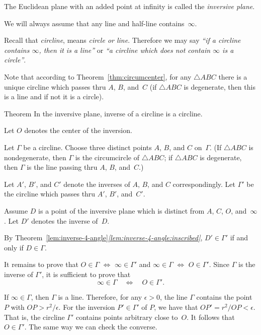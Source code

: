 The Euclidean plane with an added point at infinity is called the \emph{inversive plane}.

We will always assume that any line and half-line contains~$\infty$. 

Recall that
\emph{circline},
means {}\emph{circle or line}.
Therefore we may say 
{}\emph{``if a circline contains $\infty$, then it is a line''} or {}\emph{``a circline which does not contain $\infty$  is a circle''}.

Note that according to Theorem~\ref{thm:circumcenter}, 
for any $\triangle ABC$ there is a unique circline which passes thru $A$, $B$, and~$C$
(if $\triangle ABC$ is degenerate, then this is a line and if not it is a circle).

\begin{thm}{Theorem}\label{thm:inverse-cline}
In the inversive plane, inverse of a circline is a circline.
\end{thm}

Let $O$ denotes the center of the inversion.

Let $\Gamma$ be a circline.
Choose three distinct points $A$, $B$, and $C$ on~$\Gamma$.
(If $\triangle ABC$ is nondegenerate, 
then $\Gamma$ is the circumcircle of $\triangle ABC$;
if $\triangle ABC$ is degenerate, 
then $\Gamma$ is the line passing thru $A$, $B$, and~$C$.)

Let $A'$, $B'$, and $C'$ denote the inverses of $A$, $B$, and $C$ correspondingly.
Let $\Gamma'$ be the circline which passes thru $A'$, $B'$, and~$C'$.

Assume $D$ is a point of the inversive plane which is distinct from $A$, $C$, $O$, and~$\infty$.
Let $D'$ denotes the inverse of~$D$.

By Theorem~\ref{lem:inverse-4-angle}\textit{\ref{lem:inverse-4-angle:inscribed}},
$D'\in\Gamma'$ if and only if $D\in\Gamma$.

It remains to prove that 
$O\in \Gamma$ $\Leftrightarrow$ $\infty\in\Gamma'$ 
and 
$\infty\in \Gamma$ $\Leftrightarrow$ $O\in\Gamma'$.
Since $\Gamma$ is the inverse of $\Gamma'$, it is sufficient to prove that 
$$\infty\in \Gamma
\quad
\iff
\quad
O\in\Gamma'.$$

If $\infty\in\Gamma$, then $\Gamma$ is a line.
Therefore, for any $\epsilon>0$, the line $\Gamma$ contains the point $P$ with  $OP>r^2/\epsilon$.
For the inversion $P'\in\Gamma'$ of $P$, we have that $OP'=r^2/OP<\epsilon$.
That is, the circline $\Gamma'$ contains points arbitrary close to~$O$.
It follows that $O\in \Gamma'$.
The same way we can check the converse. 
\qeds



